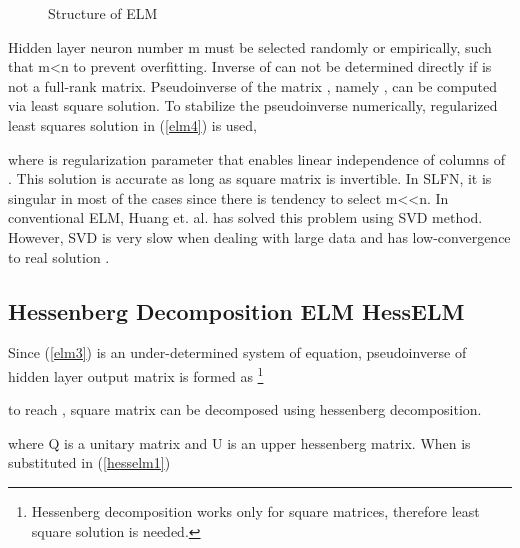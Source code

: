 \documentclass[twocolumn]{svjour3}
\begin{document}
\begin{figure}
\caption{Structure of ELM}
\label{figure4}
\end{figure}
\label{ELM1}

Hidden layer neuron number m must be selected randomly or empirically, such that m<n to prevent overfitting. Inverse of  can not be determined directly if   is not a full-rank matrix. Pseudoinverse of the matrix , namely , can be computed via least square solution. To stabilize the pseudoinverse numerically, regularized least squares solution in (\ref{elm4}) is used,


where  is regularization parameter that enables linear independence of columns of . This solution is accurate as long as square matrix  is invertible. In SLFN, it is singular in most of the cases since there is tendency to select m<<n. In conventional ELM, Huang et. al. \cite{ref22} has solved this problem using SVD \cite{ref23} method. However, SVD is very slow when dealing with large data and has low-convergence to real solution \cite{ref24,ref25}.

\subsection{Hessenberg Decomposition ELM HessELM}
Since (\ref{elm3})  is an under-determined system of equation,  pseudoinverse of hidden layer output matrix  is formed as \footnote{Hessenberg decomposition works only for square matrices, therefore least square solution is needed.}

to reach , square matrix  can be decomposed using hessenberg decomposition.

where Q  is a unitary matrix and U is an upper hessenberg matrix. When  is substituted in (\ref{hesselm1})
\end{document}
